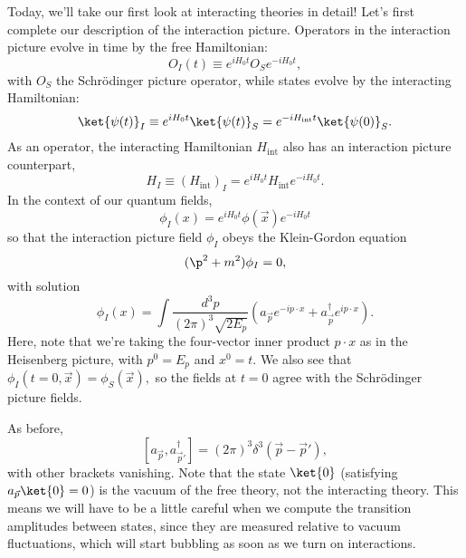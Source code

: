 Today, we'll take our first look at interacting theories in detail! Let's first complete our description of the interaction picture. Operators in the interaction picture evolve in time by the free Hamiltonian:
\begin{equation}
    O_I(t) \equiv e^{iH_0t}O_S e^{-iH_0t},
\end{equation}
with $O_S$ the Schr\"odinger picture operator, while states evolve by the interacting Hamiltonian:
\begin{equation}
    \ket{\psi(t)}_I \equiv e^{iH_0t}\ket{\psi(t)}_S
        =e^{-iH_{\mathrm{int}}t}\ket{\psi(0)}_S.
\end{equation}
As an operator, the interacting Hamiltonian $H_{\mathrm{int}}$ also has an interaction picture counterpart,
\begin{equation}
    H_I\equiv (H_{\mathrm{int}})_I=e^{iH_0t} H_{\mathrm{int}} e^{-iH_0t}.
\end{equation}
In the context of our quantum fields,
$$\phi_I(x)=e^{iH_0t}\phi(\vec x)e^{-iH_0t}$$
so that the interaction picture field $\phi_I$ obeys the Klein-Gordon equation
$$(\p^2+m^2)\phi_I=0,$$ with solution
$$\phi_I(x)=\int \frac{d^3p}{(2\pi)^3 \sqrt{2E_p}} (a_{\vec p} e^{-ip \cdot x}+ a_{\vec p}^\dagger e^{ip \cdot x}).$$
Here, note that we're taking the four-vector inner product $p\cdot x$ as in the Heisenberg picture, with $p^0=E_p$ and $x^0=t$. We also see that
$\phi_I(t=0,\vec x)= \phi_S(\vec x),$ so the fields at $t=0$ agree with the Schr\"odinger picture fields.

As before,
$$[a_{\vec p},a_{\vec p'}^\dagger]=(2\pi)^3 \delta^3(\vec p - \vec p'),$$ 
with other brackets vanishing. Note that the state $\ket{0}$ (satisfying $a_{\vec p}\ket{0}=0$) is the vacuum of the free theory, not the interacting theory. This means we will have to be a little careful when we compute the transition amplitudes between states, since they are measured relative to vacuum fluctuations, which will start bubbling as soon as we turn on interactions. 

